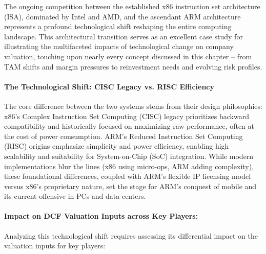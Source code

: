 The ongoing competition between the established x86 instruction set architecture (ISA), dominated by Intel and AMD, and the ascendant ARM architecture represents a profound technological shift reshaping the entire computing landscape. This architectural transition serves as an excellent case study for illustrating the multifaceted impacts of technological change on company valuation, touching upon nearly every concept discussed in this chapter – from TAM shifts and margin pressures to reinvestment needs and evolving risk profiles.

\paragraph{The Technological Shift: CISC Legacy vs. RISC Efficiency}

The core difference between the two systems stems from their design philosophies: x86's Complex Instruction Set Computing (CISC) legacy prioritizes backward compatibility and historically focused on maximizing raw performance, often at the cost of power consumption. ARM's Reduced Instruction Set Computing (RISC) origins emphasize simplicity and power efficiency, enabling high scalability and suitability for System-on-Chip (SoC) integration. While modern implementations blur the lines (x86 using micro-ops, ARM adding complexity), these foundational differences, coupled with ARM's flexible IP licensing model versus x86's proprietary nature, set the stage for ARM's conquest of mobile and its current offensive in PCs and data centers.

\paragraph{Impact on DCF Valuation Inputs across Key Players:}

Analyzing this technological shift requires assessing its differential impact on the valuation inputs for key players:

